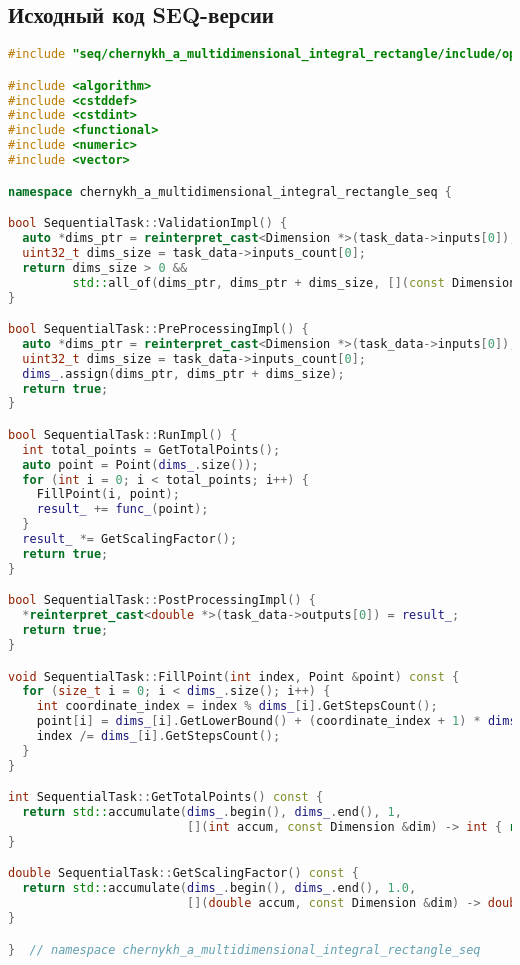 \documentclass[a4paper,12pt]{article}
\begin{document}
  \subsection{Исходный код SEQ-версии}\label{subsec:seq}

  \begin{lstlisting}[language=C++,label={lst:seq}]
#include "seq/chernykh_a_multidimensional_integral_rectangle/include/ops_seq.hpp"

#include <algorithm>
#include <cstddef>
#include <cstdint>
#include <functional>
#include <numeric>
#include <vector>

namespace chernykh_a_multidimensional_integral_rectangle_seq {

bool SequentialTask::ValidationImpl() {
  auto *dims_ptr = reinterpret_cast<Dimension *>(task_data->inputs[0]);
  uint32_t dims_size = task_data->inputs_count[0];
  return dims_size > 0 &&
         std::all_of(dims_ptr, dims_ptr + dims_size, [](const Dimension &dim) -> bool { return dim.IsValid(); });
}

bool SequentialTask::PreProcessingImpl() {
  auto *dims_ptr = reinterpret_cast<Dimension *>(task_data->inputs[0]);
  uint32_t dims_size = task_data->inputs_count[0];
  dims_.assign(dims_ptr, dims_ptr + dims_size);
  return true;
}

bool SequentialTask::RunImpl() {
  int total_points = GetTotalPoints();
  auto point = Point(dims_.size());
  for (int i = 0; i < total_points; i++) {
    FillPoint(i, point);
    result_ += func_(point);
  }
  result_ *= GetScalingFactor();
  return true;
}

bool SequentialTask::PostProcessingImpl() {
  *reinterpret_cast<double *>(task_data->outputs[0]) = result_;
  return true;
}

void SequentialTask::FillPoint(int index, Point &point) const {
  for (size_t i = 0; i < dims_.size(); i++) {
    int coordinate_index = index % dims_[i].GetStepsCount();
    point[i] = dims_[i].GetLowerBound() + (coordinate_index + 1) * dims_[i].GetStepSize();
    index /= dims_[i].GetStepsCount();
  }
}

int SequentialTask::GetTotalPoints() const {
  return std::accumulate(dims_.begin(), dims_.end(), 1,
                         [](int accum, const Dimension &dim) -> int { return accum * dim.GetStepsCount(); });
}

double SequentialTask::GetScalingFactor() const {
  return std::accumulate(dims_.begin(), dims_.end(), 1.0,
                         [](double accum, const Dimension &dim) -> double { return accum * dim.GetStepSize(); });
}

}  // namespace chernykh_a_multidimensional_integral_rectangle_seq
  \end{lstlisting}
\end{document}
